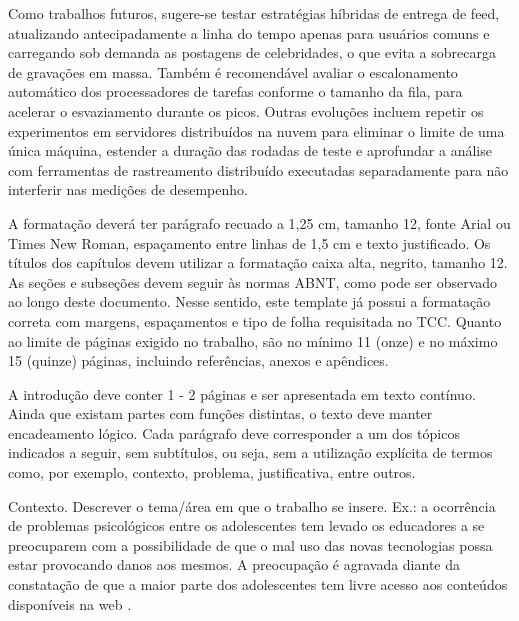 Como trabalhos futuros, sugere-se testar estratégias híbridas de entrega de feed, atualizando antecipadamente a linha do tempo apenas para usuários comuns e carregando sob demanda as postagens de celebridades, o que evita a sobrecarga de gravações em massa. Também é recomendável avaliar o escalonamento automático dos processadores de tarefas conforme o tamanho da fila, para acelerar o esvaziamento durante os picos. Outras evoluções incluem repetir os experimentos em servidores distribuídos na nuvem para eliminar o limite de uma única máquina, estender a duração das rodadas de teste e aprofundar a análise com ferramentas de rastreamento distribuído executadas separadamente para não interferir nas medições de desempenho.

\iffalse


A formatação deverá ter parágrafo recuado a 1,25 cm, tamanho 12, fonte Arial ou Times New Roman, espaçamento entre linhas de 1,5 cm e texto justificado. Os títulos dos capítulos devem utilizar a formatação caixa alta, negrito, tamanho 12. As seções e subseções devem seguir às normas ABNT, como pode ser observado ao longo deste documento. Nesse sentido, este template já possui a formatação correta com margens, espaçamentos e tipo de folha requisitada no TCC. Quanto ao limite de páginas exigido no trabalho, são no mínimo 11 (onze) e no máximo 15 (quinze) páginas, incluindo referências, anexos e apêndices.

A introdução deve conter 1 - 2 páginas e ser apresentada em texto contínuo. Ainda que existam partes com funções distintas, o texto deve manter encadeamento lógico. Cada parágrafo deve corresponder a um dos tópicos indicados a seguir, sem subtítulos, ou seja, sem a utilização explícita de termos como, por exemplo, contexto, problema, justificativa, entre outros.

	Contexto. Descrever o tema/área em que o trabalho se insere. 
	Ex.: a ocorrência de problemas psicológicos entre os adolescentes tem levado os educadores a se preocuparem com a possibilidade de que o mal uso das novas tecnologias possa estar provocando danos aos mesmos. A preocupação é agravada diante da constatação de que a maior parte dos adolescentes tem livre acesso aos conteúdos disponíveis na web \cite{citelli2004,martins2012}.
	
